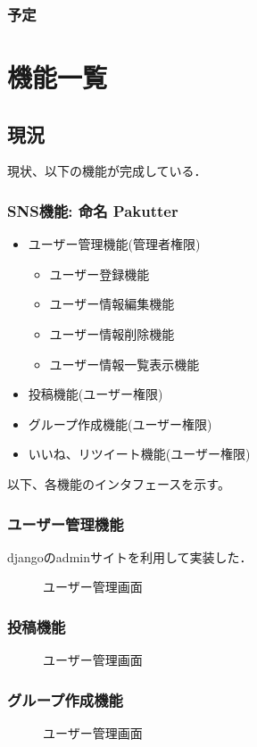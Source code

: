\documentclass[a4j]{jarticle}
\begin{document}
\subsubsection{予定}
\section{機能一覧}
\subsection{現況}  
現状、以下の機能が完成している．
\subsubsection*{SNS機能: 命名 Pakutter}
\begin{itemize}
  \item ユーザー管理機能(管理者権限)
  \begin{itemize}
    \item ユーザー登録機能
    \item ユーザー情報編集機能
    \item ユーザー情報削除機能
    \item ユーザー情報一覧表示機能
  \end{itemize}
  \item 投稿機能(ユーザー権限)
  \item グループ作成機能(ユーザー権限)
  \item いいね、リツイート機能(ユーザー権限)
\end{itemize}
以下、各機能のインタフェースを示す。
\subsubsection{ユーザー管理機能}
djangoのadminサイトを利用して実装した．
\begin{figure}[htbp]
  \centering
  \caption{ユーザー管理画面}
\end{figure}

\subsubsection{投稿機能}

\begin{figure}[htbp]
  \centering
  \caption{ユーザー管理画面}
\end{figure}

\subsubsection{グループ作成機能}
\begin{figure}[htbp]
  \centering
  \caption{ユーザー管理画面}
\end{figure}
\end{document}
